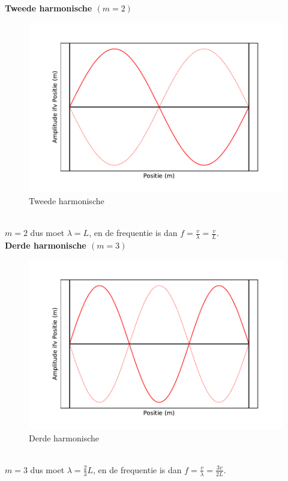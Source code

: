 \documentclass[a4paper,kul]{kulakarticle} %
\begin{document}
\newpage
\textbf{Tweede harmonische $(m = 2)$}\\
\begin{figure}[h]
	\centering
	\includegraphics[width=0.7\linewidth]{Tweede_harm}
	\caption[Tweede harmonische]{Tweede harmonische}
	\label{fig:tweedeharm}
\end{figure}\\
$m = 2$ dus moet $\lambda = L$, en de frequentie is dan $f = \frac{v}{\lambda} = \frac{v}{L}$.\\
\textbf{Derde harmonische $(m = 3)$}\\
\begin{figure}[h]
	\centering
	\includegraphics[width=0.7\linewidth]{Derde_harm}
	\caption[Derde harmonische]{Derde harmonische}
	\label{fig:Derdeharm}
\end{figure}\\
$m = 3$ dus moet $\lambda = \frac{2}{3}L$, en de frequentie is dan $f = \frac{v}{\lambda} = \frac{3v}{2L}$.\\
\newpage
\end{document}

